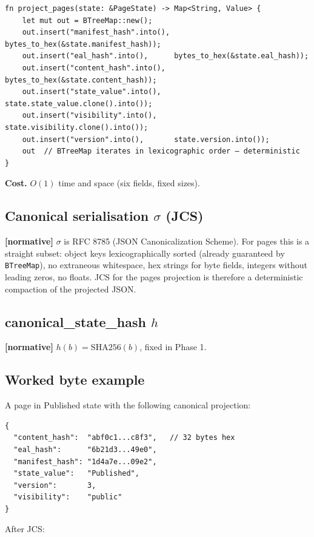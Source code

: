 \documentclass[11pt,a4paper]{article}
\newcommand{\normsv}{\textcolor{normativecolor}{\textbf{[normative]}}\xspace}
\theoremstyle{definition}
\begin{document}
\begin{lstlisting}
fn project_pages(state: &PageState) -> Map<String, Value> {
    let mut out = BTreeMap::new();
    out.insert("manifest_hash".into(), bytes_to_hex(&state.manifest_hash));
    out.insert("eal_hash".into(),      bytes_to_hex(&state.eal_hash));
    out.insert("content_hash".into(),  bytes_to_hex(&state.content_hash));
    out.insert("state_value".into(),   state.state_value.clone().into());
    out.insert("visibility".into(),    state.visibility.clone().into());
    out.insert("version".into(),       state.version.into());
    out  // BTreeMap iterates in lexicographic order — deterministic
}
\end{lstlisting}

\textbf{Cost.} $O(1)$ time and space (six fields, fixed sizes).

\subsection{Canonical serialisation $\sigma$ (JCS)}

\normsv{} $\sigma$ is RFC 8785 (JSON Canonicalization Scheme).
For pages this is a straight subset: object keys lexicographically
sorted (already guaranteed by \texttt{BTreeMap}), no extraneous
whitespace, hex strings for byte fields, integers without leading
zeros, no floats. JCS for the pages projection is therefore a
deterministic compaction of the projected JSON.

\subsection{canonical\_state\_hash $h$}

\normsv{} $h(b) = \mathrm{SHA256}(b)$, fixed in Phase 1.

\subsection{Worked byte example}

A page in Published state with the following canonical projection:

\begin{lstlisting}
{
  "content_hash":  "abf0c1...c8f3",   // 32 bytes hex
  "eal_hash":      "6b21d3...49e0",
  "manifest_hash": "1d4a7e...09e2",
  "state_value":   "Published",
  "version":       3,
  "visibility":    "public"
}
\end{lstlisting}

After JCS:
\end{document}
